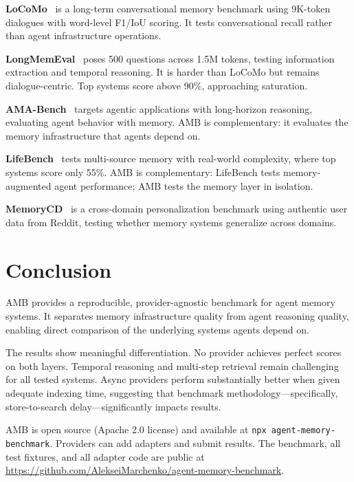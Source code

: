 \documentclass[11pt]{article}
\begin{document}
\textbf{LoCoMo}~\citep{maharana2024} is a long-term conversational memory benchmark using 9K-token dialogues with word-level F1/IoU scoring. It tests conversational recall rather than agent infrastructure operations.

\textbf{LongMemEval}~\citep{wu2025} poses 500 questions across 1.5M tokens, testing information extraction and temporal reasoning. It is harder than LoCoMo but remains dialogue-centric. Top systems score above 90\%, approaching saturation.

\textbf{AMA-Bench}~\citep{amabench2026} targets agentic applications with long-horizon reasoning, evaluating agent behavior with memory. AMB is complementary: it evaluates the memory infrastructure that agents depend on.

\textbf{LifeBench}~\citep{lifebench2026} tests multi-source memory with real-world complexity, where top systems score only 55\%. AMB is complementary: LifeBench tests memory-augmented agent performance; AMB tests the memory layer in isolation.

\textbf{MemoryCD}~\citep{memorycd2026} is a cross-domain personalization benchmark using authentic user data from Reddit, testing whether memory systems generalize across domains.

\section{Conclusion}

AMB provides a reproducible, provider-agnostic benchmark for agent memory systems. It separates memory infrastructure quality from agent reasoning quality, enabling direct comparison of the underlying systems agents depend on.

The results show meaningful differentiation. No provider achieves perfect scores on both layers. Temporal reasoning and multi-step retrieval remain challenging for all tested systems. Async providers perform substantially better when given adequate indexing time, suggesting that benchmark methodology---specifically, store-to-search delay---significantly impacts results.

AMB is open source (Apache 2.0 license) and available at \texttt{npx agent-memory-benchmark}. Providers can add adapters and submit results. The benchmark, all test fixtures, and all adapter code are public at \url{https://github.com/AlekseiMarchenko/agent-memory-benchmark}.


\end{document}
